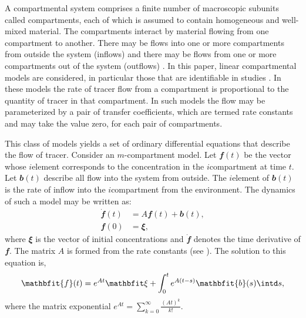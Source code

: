 A compartmental system comprises a finite number of macroscopic subunits
called compartments, each of which is assumed to contain homogeneous and
well-mixed material. The compartments interact by material flowing from one
compartment to another. There may be flows into one or more compartments from
outside the system (inflows) and there may be flows from one or more
compartments out of the system (outflows) \cite{Jacquez:1996gc}. In this
paper, linear compartmental models are considered, in particular those that
are identifiable in \pet studies \cite{Schmidt99}. In these models the rate
of tracer flow from a compartment is proportional to the quantity of tracer in
that compartment. In such models the flow may be parameterized by a pair of
transfer coefficients, which are termed rate constants and may take the value
zero, for each pair of compartments.

This class of models yields a set of ordinary differential equations that
describe the flow of tracer. Consider an $m$-compartment model. Let
$\mathbfit{f}(t)$ be the vector whose $i$\xth element corresponds to the
concentration in the $i$\xth compartment at time $t$. Let $\mathbfit{b}(t)$ describe
all flow into the system from outside. The $i$\xth element of $\mathbfit{b}(t)$ is
the rate of inflow into the $i$\xth compartment from the environment. The
dynamics of such a model may be written as:
\begin{align*}
  \dot{\mathbfit{f}}(t) &= A\mathbfit{f}(t) + \mathbfit{b}(t), \\
  \mathbfit{f}(0) &= \mathbfit\xi,
\end{align*}
where $\mathbfit\xi$ is the vector of initial concentrations and
$\dot{\mathbfit{f}}$
denotes the time derivative of $\mathbfit{f}$. The matrix $A$ is formed from
the rate constants (see \cite{Gunn:2001cx}).  The solution to this equation
is,
\begin{equation*}
  \mathbfit{f}(t) = e^{A t}\mathbfit\xi + \int_0^t e^{A(t-s)}\mathbfit{b}(s)\intd s,
\end{equation*}
where the matrix exponential $e^{A t} = \sum_{k = 0}^{\infty}
\frac{(A t)^k}{k!}$.

